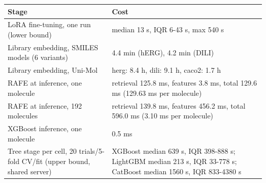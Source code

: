 \begin{tabular}{@{}p{}p{}@{}}
\toprule
Stage & Cost \\
\midrule
LoRA fine-tuning, one run (lower bound) & median 13 s, IQR 6-43 s, max 540 s \\
Library embedding, SMILES models (6 variants) & 4.4 min (hERG), 4.2 min (DILI) \\
Library embedding, Uni-Mol & herg: 8.4 h, dili: 9.1 h, caco2: 1.7 h \\
RAFE at inference, one molecule & retrieval 125.8 ms, features 3.8 ms, total 129.6 ms (129.63 ms per molecule) \\
RAFE at inference, 192 molecules & retrieval 139.8 ms, features 456.2 ms, total 596.0 ms (3.10 ms per molecule) \\
XGBoost inference, one molecule & 0.5 ms \\
Tree stage per cell, 20 trials/5-fold CV/fit (upper bound, shared server) & XGBoost median 639 s, IQR 398-888 s; LightGBM median 213 s, IQR 33-778 s; CatBoost median 1560 s, IQR 833-4380 s \\
\bottomrule
\end{tabular}
